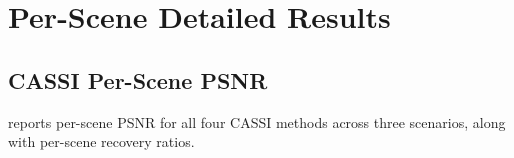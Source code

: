 \documentclass[runningheads]{llncs}
\begin{document}
\appendix

\maketitle

\section{Per-Scene Detailed Results}
\label{sec:per_scene}

\subsection{CASSI Per-Scene PSNR}

 reports per-scene PSNR for all four CASSI methods across three scenarios, along with per-scene recovery ratios.
\end{document}
